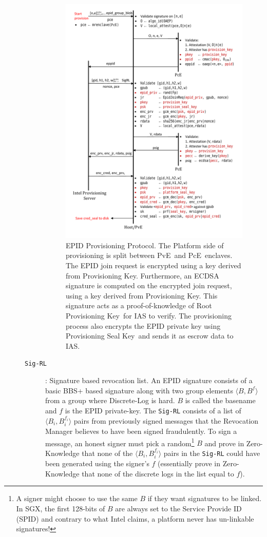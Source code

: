 \documentclass[letterpaper]{article}
\newcommand{\pve}{\textsf{PvE}}
\newcommand{\pce}{\textsf{PcE}}
\newcommand{\rpk}{\textsf{Root Provisioning Key}}
\newcommand{\pk}{\textsf{Provisioning Key}}
\newcommand{\psk}{\textsf{Provisioning Seal Key}}
\begin{document}
\begin{description}
\begin{description}
  \begin{figure}
  \centering
  \includegraphics[width=0.8\linewidth]{Diagrams/EpidProvisioning}
  \caption{EPID Provisioning Protocol. The Platform side of
    provisioning is split between \pve\ and \pce\ enclaves. The EPID
    join request is encrypted using a key derived from
    \pk. Furthermore, an ECDSA signature is computed on the encrypted
    join request, using a key derived from \pk. This signature acts as
    a proof-of-knowledge of \rpk\ for IAS to verify. The provisioning
    process also encrypts the EPID private key using \psk\ and sends
    it as escrow data to IAS.}
  \label{fig:epidprov}
  \end{figure}

      \item[\texttt{Sig-RL}]: Signature based revocation list. An EPID
        signature consists of a basic BBS+ \cite{bbsplus, bbs} based
        signature along with two group elements $\langle B, B^f
        \rangle$ from a group where Discrete-Log is hard. $B$ is
        called the basename and $f$ is the EPID private-key. The
        \texttt{Sig-RL} consists of a list of $\langle B_i, B_i^{f_i}
        \rangle$ pairs from previously signed messages that the
        Revocation Manager believes to have been signed
        fraudulently. To sign a message, an honest signer must pick a
        random\footnote{A signer might choose to use the same $B$ if
          they want signatures to be linked. In SGX, the first
          128-bits of $B$ are always set to the Service Provide ID
          (SPID) \cite{ias} and contrary to what Intel claims, a
          platform never has un-linkable signatures!} $B$ and prove in
        Zero-Knowledge that none of the $\langle B_i, B_i^{f_i}
        \rangle$ pairs in the \texttt{Sig-RL} could have been
        generated using the signer's $f$ (essentially prove in
        Zero-Knowledge that none of the discrete logs in the list
        equal to $f$).


\end{description}
\end{description}
\end{document}
